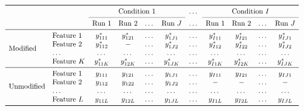 \documentclass{mcp}
\begin{document}
\begin{figure}[h!]
\centering
\begin{footnotesize}
\[
\begin{array}{l l c c c c c c c c c} 
\toprule
 &  & \multicolumn{4}{c}{\text{Condition }1} & \dots & \multicolumn{4}{c}{\text{Condition }I} \\ 
\cmidrule{3-6} 
\cmidrule{8-11} 
 &  &  \text{Run }1 & \text{Run }2 & \dots & \text{Run }J & \dots & \text{Run }1 & \text{Run }2 & \dots & \text{Run }J \\
\midrule
\multirow{4}{*}{Modified} & \text{Feature }1 & y_{111}^{\ast} & y_{121}^{\ast} & \dots & y_{1J1}^{\ast} & \dots & y_{I11}^{\ast} & y_{I21}^{\ast} & \dots & y_{IJ1}^{\ast} \\
 & \text{Feature }2 & y_{112}^{\ast} & - & \dots & y_{1J2}^{\ast} & \dots & y_{I12}^{\ast} & y_{I22}^{\ast} & \dots & y_{IJ2}^{\ast}  \\
 & \dots & \dots & \dots & \dots & \dots & \dots & \dots & \dots & \dots & \dots \\
 & \text{Feature }K & y_{11K}^{\ast} & y_{12K}^{\ast} & \dots & y_{1JK}^{\ast} & \dots & y_{I1K}^{\ast} & y_{I2K}^{\ast} & \dots & y_{IJK}^{\ast} \\
\midrule
\multirow{4}{*}{Unmodified} & \text{Feature }1 & y_{111} & y_{121} & \dots & y_{1J1} & \dots & y_{I11} & y_{I21} & \dots & y_{IJ1} \\
 & \text{Feature }2 & y_{112} & y_{122} & \dots & y_{1J2} & \dots & - & - & \dots & -  \\
 & \dots & \dots & \dots & \dots & \dots & \dots & \dots & \dots & \dots & \dots \\
 & \text{Feature }L & y_{11L} & y_{12L} & \dots & y_{1JL} & \dots & y_{I1L} & y_{I2L} & \dots & y_{IJL} \\
\bottomrule
\end{array}
\]

\end{footnotesize}
\end{figure}
\end{document}
